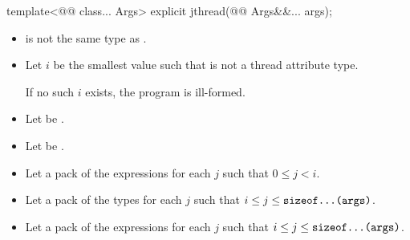 \documentclass{wg21}
\begin{document}
%
\begin{itemdecl}
template<@@ class... Args>
explicit jthread(@@ Args&&... args);\end{itemdecl}\begin{itemdescr}\begin{itemize}
\item {} is not the same type as .
\end{itemize}

\begin{addedblock}
\begin{itemize}[leftmargin=*]
\item Let $i$ be the smallest value such that  is not a thread attribute type. 

If no such $i$ exists, the program is ill-formed.

\item Let  be .
\item Let  be .
\item Let  a pack of the expressions  for each $j$ such that $ 0 \leq j < i $.
\item Let  a pack of the types  for each $j$ such that $ i \le j \le \texttt{sizeof...(args)}$.
\item Let  a pack of the expressions  for each $j$ such that $ i \le j \le \texttt{sizeof...(args)}$.
\end{itemize}
\end{addedblock}


\end{itemdescr}
\end{document}
